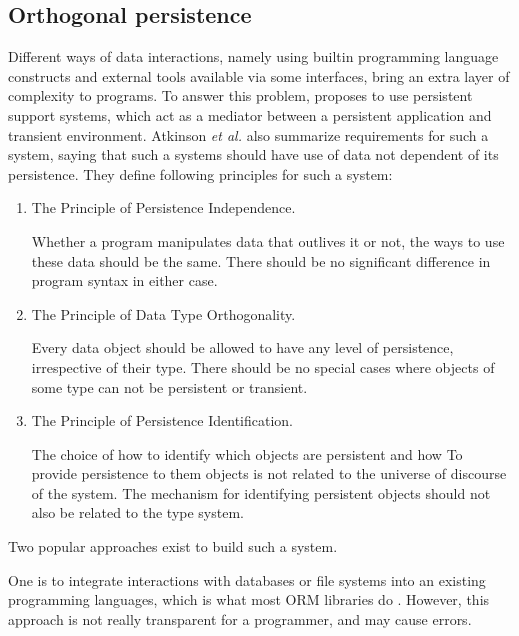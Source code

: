 \subsection{Orthogonal persistence}
\label{sec:LR:orth-persistence}

Different ways of data interactions, namely using builtin programming language 
constructs and external tools available via some interfaces, bring an extra
layer of complexity to programs. To answer this problem, 
\cite{atkinson1995orthogonally} proposes to use persistent support systems, 
which act as a mediator between a persistent application and transient 
environment. Atkinson \textit{et al.} also summarize requirements for such a
system, saying that such a systems should have use of data not dependent of its
persistence. They define following principles for such a system:
\begin{enumerate}
    \item The Principle of Persistence Independence. 
    
    Whether a program manipulates data that outlives it or not, the ways to use
    these data should be the same. There should be no significant difference in
    program syntax in either case.

    \item The Principle of Data Type Orthogonality. 
    
    Every data object should be allowed to have any level of persistence, 
    irrespective of their type. There should be no special cases where objects
    of some type can not be persistent or transient.
    
    \item  The Principle of Persistence Identification. 
    
    The choice of how to identify which objects are persistent and how To
    provide persistence to them objects is not related to the universe of 
    discourse of the system. The mechanism for identifying persistent objects 
    should not also be related to the type system.

\end{enumerate}

Two popular approaches exist to build such a system. 

One is to integrate interactions with databases or file systems into an existing 
programming languages, which is what most ORM libraries do 
\cite{аннин2018краткий,copeland2008essential}. However, this approach is not 
really transparent for a programmer, and may cause errors. 


